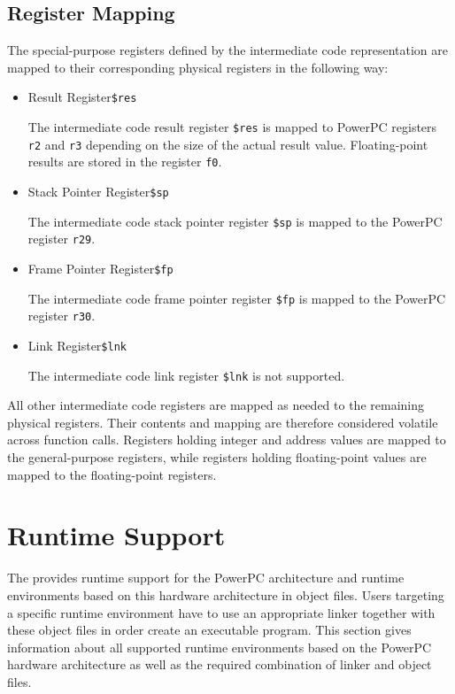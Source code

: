 \subsection{Register Mapping}

The special-purpose registers defined by the intermediate code representation are mapped to their corresponding physical registers in the following way:

\begin{itemize}

\item Result Register\alignright\texttt{\$res}\nopagebreak

The intermediate code result register \texttt{\$res} is mapped to PowerPC registers \texttt{r2} and \texttt{r3} depending on the size of the actual result value.
Floating-point results are stored in the register \texttt{f0}.

\item Stack Pointer Register\alignright\texttt{\$sp}\nopagebreak

The intermediate code stack pointer register \texttt{\$sp} is mapped to the PowerPC register \texttt{r29}.

\item Frame Pointer Register\alignright\texttt{\$fp}\nopagebreak

The intermediate code frame pointer register \texttt{\$fp} is mapped to the PowerPC register \texttt{r30}.

\item Link Register\alignright\texttt{\$lnk}\nopagebreak

The intermediate code link register \texttt{\$lnk} is not supported.

\end{itemize}

All other intermediate code registers are mapped as needed to the remaining physical registers.
Their contents and mapping are therefore considered volatile across function calls.
Registers holding integer and address values are mapped to the general-purpose registers,
while registers holding floating-point values are mapped to the floating-point registers.

\section{Runtime Support}

The \ecs{} provides runtime support for the PowerPC architecture and runtime environments based on this hardware architecture in object files.
Users targeting a specific runtime environment have to use an appropriate linker together with these object files in order create an executable program.
This section gives information about all supported runtime environments based on the PowerPC hardware architecture as well as the required combination of linker and object files.

